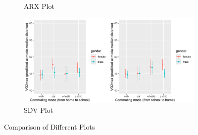 \begin{figure}[htbp]
\begin{subfigure}[b]{0.48\textwidth}
            \caption{ARX Plot}
            \label{fig:r_arx_plot}
        \end{subfigure}
        \hspace{0.0\textwidth}
        \begin{subfigure}[b]{0.48\textwidth}
            \centering
            \includegraphics[width=\textwidth]{figs/r_sdv_plot.png}
            \caption{SDV Plot}
            \label{fig:r_sdv_plot}
        \end{subfigure}
        \caption{Comparison of Different Plots}
        \label{fig:comparison_plots}
    \end{figure}

    